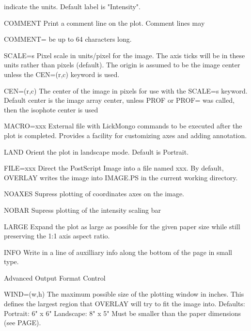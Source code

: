 {\begin{command}
{                  indicate the units. Default label is "Intensity".}
  \item[COMMENT ]{Print a comment line on the plot.  Comment lines may}
  \item[COMMENT= ]{be up to 64 characters long. }
  \item[SCALE=s ]{Pixel scale in units/pixel for the image.  The axis ticks 
                  will be in these units rather than pixels (default).  
                  The origin is assumed to be the image center unless the 
                  CEN=(r,c) keyword is used.}
  \item[CEN=(r,c) ]{The center of the image in pixels for use with the SCALE=s 
                  keyword.  Default center is the image array center, unless 
                  PROF or PROF= was called, then the isophote center is used }
  \item[MACRO=xxx]{External file with LickMongo commands to be executed 
                  after the plot is completed.  Provides a facility for 
                  customizing axes and adding annotation.}
  \item[LAND ]{Orient the plot in landscape mode.  Default is Portrait.}
  \item[FILE=xxx]{Direct the PostScript Image into a file named xxx.  By 
                  default, OVERLAY writes the image into IMAGE.PS in the 
                  current working directory.}
  \item[NOAXES ]{Supress plotting of coordinates axes on the image.}
  \item[NOBAR ]{Supress plotting of the intensity scaling bar}
  \item[LARGE]{Expand the plot as large as possible for the given paper size
               while still preserving the 1:1 axis aspect ratio.}
  \item[INFO]{Write in a line of auxilliary info along the bottom of 
              the page in small type.}
  \item[Advanced Output Format Control\hfill]{}
  \item[WIND=(w,h)]{The maximum possible size of the plotting window in inches.
                  This defines the largest region that OVERLAY will try to 
                  fit the image into.  Defaults:\newline
                         Portrait:  6" x 6"\newline
                         Landscape: 8" x 5"\newline
                  Must be smaller than the paper dimensions (see PAGE).}

\end{command}}
